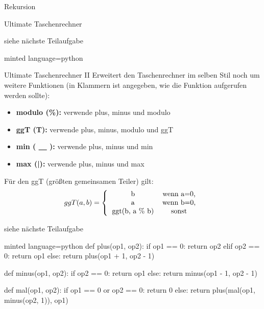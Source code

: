 \begin{task}[points=auto]{Rekursion}
\begin{subtask*}[points=0]{Ultimate Taschenrechner }
        \begin{solution}
            siehe nächste Teilaufgabe
            \begin{codeBlock}[]{minted language=python}

            \end{codeBlock}
        \end{solution}
    \end{subtask*}
    \begin{subtask*}[points=0]{Ultimate Taschenrechner II }
        Erweitert den Taschenrechner im selben Stil noch um weitere Funktionen (in Klammern ist angegeben, wie die Funktion aufgerufen werden sollte):
        \begin{itemize}
            \item \textbf{\textcolor[rgb]{0,0.5,1}{modulo (\%):}} verwende plus, minus und modulo
            \item \textbf{\textcolor[rgb]{0,0.5,1}{ggT (T):}} verwende plus, minus, modulo und ggT
            \item \textbf{\textcolor[rgb]{0,0.5,1}{min ( \underline{\ \ } ):}} verwende plus, minus und min
            \item \textbf{\textcolor[rgb]{0,0.5,1}{max (|):}} verwende plus, minus und max
        \end{itemize}
        Für den ggT (größten gemeinsamen Teiler) gilt:
        $$ggT(a,b)=\left\{\begin{tabular}{cc}b&wenn a=0,\\a&wenn b=0,\\ggt(b, a \% b)&sonst\end{tabular}\right.$$

        \begin{solution}
            siehe nächste Teilaufgabe
            \begin{codeBlock}[]{minted language=python}
                def plus(op1, op2):
                    if op1 == 0:
                        return op2
                    elif op2 == 0:
                        return op1
                    else:
                        return plus(op1 + 1, op2 - 1)


                def minus(op1, op2):
                    if op2 == 0:
                        return op1
                    else:
                        return minus(op1 - 1, op2 - 1)


                def mal(op1, op2):
                    if op1 == 0 or op2 == 0:
                        return 0
                    else:
                        return plus(mal(op1, minus(op2, 1)), op1)



\end{codeBlock}
\end{solution}
\end{subtask*}
\end{task}
